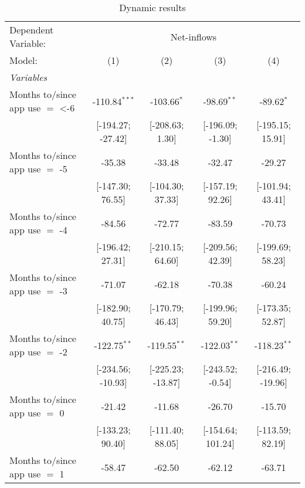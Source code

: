 
\begin{table}[htbp]
   \centering
   \tiny
   \begin{threeparttable}[b]
      \caption{\label{tab:reg_dynamic} Dynamic results}
      \begin{tabular}{lcccc}
         \tabularnewline \midrule \midrule
         Dependent Variable: & \multicolumn{4}{c}{Net-inflows}\\
         Model:                          & (1)               & (2)               & (3)               & (4)\\  
         \midrule
         \emph{Variables}\\
         Months to/since app use $=$ <-6 & -110.84$^{***}$   & -103.66$^{*}$     & -98.69$^{**}$     & -89.62$^{*}$\\   
                                         & [-194.27; -27.42] & [-208.63; 1.30]   & [-196.09; -1.30]  & [-195.15; 15.91]\\   
         Months to/since app use $=$ -5  & -35.38            & -33.48            & -32.47            & -29.27\\   
                                         & [-147.30; 76.55]  & [-104.30; 37.33]  & [-157.19; 92.26]  & [-101.94; 43.41]\\   
         Months to/since app use $=$ -4  & -84.56            & -72.77            & -83.59            & -70.73\\   
                                         & [-196.42; 27.31]  & [-210.15; 64.60]  & [-209.56; 42.39]  & [-199.69; 58.23]\\   
         Months to/since app use $=$ -3  & -71.07            & -62.18            & -70.38            & -60.24\\   
                                         & [-182.90; 40.75]  & [-170.79; 46.43]  & [-199.96; 59.20]  & [-173.35; 52.87]\\   
         Months to/since app use $=$ -2  & -122.75$^{**}$    & -119.55$^{**}$    & -122.03$^{**}$    & -118.23$^{**}$\\   
                                         & [-234.56; -10.93] & [-225.23; -13.87] & [-243.52; -0.54]  & [-216.49; -19.96]\\   
         Months to/since app use $=$ 0   & -21.42            & -11.68            & -26.70            & -15.70\\   
                                         & [-133.23; 90.40]  & [-111.40; 88.05]  & [-154.64; 101.24] & [-113.59; 82.19]\\   
         Months to/since app use $=$ 1   & -58.47            & -62.50            & -62.12            & -63.71\\   

\end{tabular}
\end{threeparttable}
\end{table}
